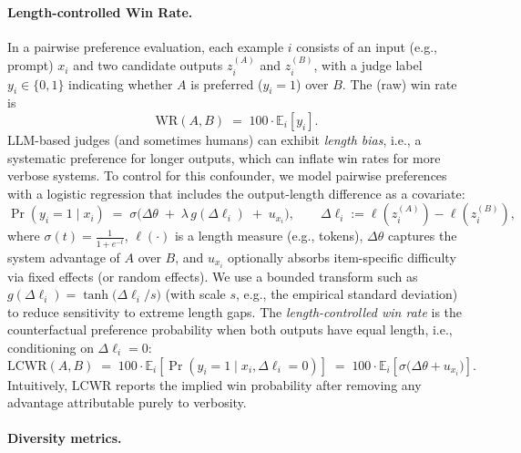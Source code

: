 \documentclass{article}
\theoremstyle{plain}
\theoremstyle{definition}
\theoremstyle{remark}
\begin{document}
\paragraph{Length-controlled Win Rate.}
In a pairwise preference evaluation, each example $i$ consists of an input (e.g., prompt) $x_i$ and two candidate outputs
$z_i^{(A)}$ and $z_i^{(B)}$, with a judge label $y_i \in \{0,1\}$ indicating whether $A$ is preferred ($y_i=1$) over $B$.
The (raw) win rate is
\begin{equation}
\mathrm{WR}(A,B) \;=\; 100 \cdot \mathbb{E}_i \left[y_i\right].
\end{equation}
LLM-based judges (and sometimes humans) can exhibit \emph{length bias}, i.e., a systematic preference for longer outputs, which can inflate win rates for more verbose systems. 
To control for this confounder, we model pairwise preferences with a logistic regression that includes the output-length
difference as a covariate:
\begin{equation}
\Pr(y_i=1 \mid x_i)
\;=\;
\sigma\!\Big(\Delta\theta \;+\; \lambda\, g(\Delta \ell_i) \;+\; u_{x_i}\Big),
\qquad
\Delta \ell_i := \ell\!\left(z_i^{(A)}\right) - \ell\!\left(z_i^{(B)}\right),
\end{equation}
where $\sigma(t)=\frac{1}{1+e^{-t}}$, $\ell(\cdot)$ is a length measure (e.g., tokens), $\Delta\theta$ captures the
system advantage of $A$ over $B$, and $u_{x_i}$ optionally absorbs item-specific difficulty via fixed effects (or random effects).
We use a bounded transform such as
$g(\Delta \ell_i)=\tanh\!\big(\Delta \ell_i / s\big)$ (with scale $s$, e.g., the empirical standard deviation) to reduce sensitivity
to extreme length gaps.
The \emph{length-controlled win rate} is the counterfactual preference probability when both outputs have equal length,
i.e., conditioning on $\Delta \ell_i = 0$:
\begin{equation}
\mathrm{LCWR}(A,B)
\;=\;
100 \cdot \mathbb{E}_i \left[\Pr(y_i=1 \mid x_i,\Delta \ell_i = 0)\right]
\;=\;
100 \cdot \mathbb{E}_i \left[\sigma\!\big(\Delta\theta + u_{x_i}\big)\right].
\end{equation}
Intuitively, $\mathrm{LCWR}$ reports the implied win probability after removing any advantage attributable purely to verbosity.



\paragraph{Diversity metrics.}
\end{document}

